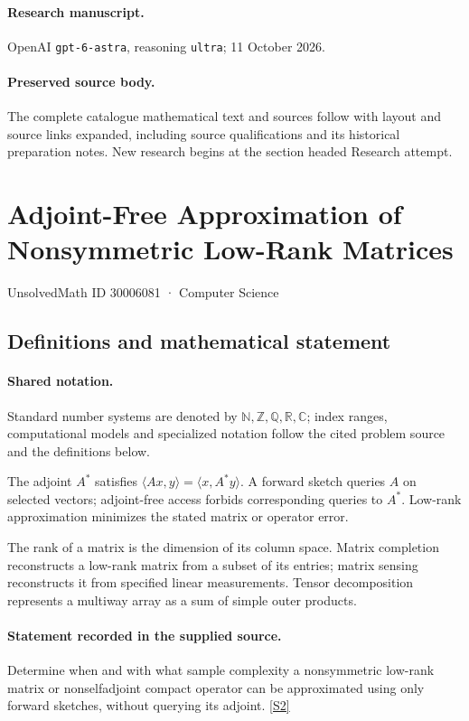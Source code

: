 \documentclass[11pt]{article}
\begin{document}
\paragraph{Research manuscript.} OpenAI \texttt{gpt-6-astra}, reasoning \texttt{ultra}; 11 October 2026.
\paragraph{Preserved source body.} The complete catalogue mathematical text and sources follow with layout and source links expanded, including source qualifications and its historical preparation notes. New research begins at the section headed Research attempt.

\section{Adjoint-Free Approximation of Nonsymmetric Low-Rank Matrices}\label{30006081}
{\small UnsolvedMath ID 30006081 · Computer Science}
\subsection{Definitions and mathematical statement}

\paragraph{Shared notation.}Standard number systems are denoted by $\mathbb N,\mathbb Z,\mathbb Q,\mathbb R,\mathbb C$; index ranges, computational models and specialized notation follow the cited problem source and the definitions below.


The adjoint $A^*$ satisfies $\langle Ax,y\rangle=\langle x,A^*y\rangle$. A forward sketch queries $A$ on selected vectors; adjoint-free access forbids corresponding queries to $A^*$. Low-rank approximation minimizes the stated matrix or operator error.

The rank of a matrix is the dimension of its column space. Matrix completion reconstructs a low-rank matrix from a subset of its entries; matrix sensing reconstructs it from specified linear measurements. Tensor decomposition represents a multiway array as a sum of simple outer products.
\paragraph{Statement recorded in the supplied source.}
Determine when and with what sample complexity a nonsymmetric low-rank matrix or nonselfadjoint compact operator can be approximated using only forward sketches, without querying its adjoint. \href{https://doi.org/10.4171/owr/2024/48}{[S2]}
\end{document}
